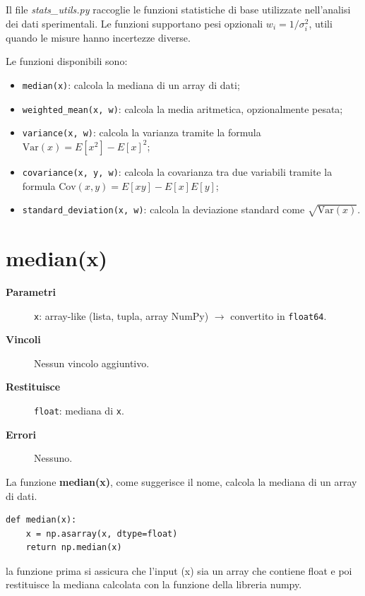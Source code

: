 Il file \textit{stats\_utils.py} raccoglie le funzioni statistiche di base utilizzate nell'analisi dei dati sperimentali. Le funzioni supportano pesi opzionali $w_i = 1/\sigma_i^2$, utili quando le misure hanno incertezze diverse.

Le funzioni disponibili sono:
\begin{itemize}
    \item \texttt{median(x)}: calcola la mediana di un array di dati;
    \item \texttt{weighted\_mean(x, w)}: calcola la media aritmetica, opzionalmente pesata;
    \item \texttt{variance(x, w)}: calcola la varianza tramite la formula $\text{Var}(x) = E[x^2] - E[x]^2$;
    \item \texttt{covariance(x, y, w)}: calcola la covarianza tra due variabili tramite la formula $\text{Cov}(x,y) = E[xy] - E[x]E[y]$;
    \item \texttt{standard\_deviation(x, w)}: calcola la deviazione standard come $\sqrt{\text{Var}(x)}$.
\end{itemize}

\section{median(x)}
\label{sec:median}
\begin{description}
  \item[\textbf{Parametri}]
    \texttt{x}: array-like (lista, tupla, array NumPy) $\to$ convertito in \texttt{float64}.
  \item[\textbf{Vincoli}]
    Nessun vincolo aggiuntivo.
  \item[\textbf{Restituisce}]
    \texttt{float}: mediana di \texttt{x}.
  \item[\textbf{Errori}]
    Nessuno.
\end{description}

La funzione \textbf{median(x)}, come suggerisce il nome, calcola la mediana di un array di dati.
\begin{verbatim}
def median(x):
    x = np.asarray(x, dtype=float)
    return np.median(x)
\end{verbatim}

la funzione prima si assicura che l'input (x) sia un array che contiene float e poi restituisce la mediana calcolata con la funzione della libreria numpy.
\newpage
